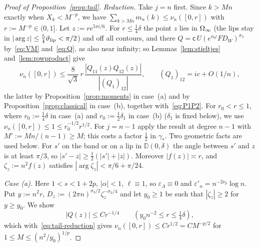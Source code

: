 \begin{proof}[Proof of Proposition~\ref{prop:tail}]
\emph{Reduction.} Take $j=n$ first. Since $k>Mn$ exactly when $X_k<M^{-p}$, we have
$\sum_{k>Mn}m_n(k)\le\nu_n([0,r])$ with $r:=M^{-p}\in(0,1]$. Let $z:=re^{5\pi i/6}$. For $r\le\frac14\delta$ the point
$z$ lies in $\Omega_{\infty}$ (the lips stay in $|\arg z|\le\frac54\vartheta_{\mathrm{lip}}<\pi/2$) and off all contours, and there
$Q=\mathsf c\,U(e^{n\varphi}FD_W)^{\sigma_3}$ by~\eqref{eq:VM} and~\eqref{eq:Q}, as also near infinity; so
Lemmas~\ref{lem:stieltjes} and~\ref{lem:rowproduct} give
\begin{equation}\label{eq:tail-reduction}
  \nu_n([0,r])\le\frac8{\sqrt3}\,r\,\frac{|Q_{11}(z)Q_{12}(z)|}{|(Q_1)_{12}|},\qquad (Q_1)_{12}=ic+O(1/n),
\end{equation}
the latter by Proposition~\ref{prop:moments} in case~(a) and by Proposition~\ref{prop:classical} in case~(b), together
with~\eqref{eq:P1P2}. For $r_0<r\le1$, where $r_0:=\frac14\delta$ in case~(a) and $r_0:=\frac12\delta_1$ in case~(b)
($\delta_1$ is fixed below), we use $\nu_n([0,r])\le1\le r_0^{-1/2}r^{1/2}$. For $j=n-1$ apply the
result at degree $n-1$ with $M':=Mn/(n-1)\ge M$; this costs a factor $\frac12$ in $\gamma_*$. Two geometric facts are
used below. For $s'$ on the band or on a lip in $\mathbb D(0,\delta)$ the angle between $s'$ and $z$ is at least $\pi/3$,
so $|s'-z|\ge\frac12(|s'|+|z|)$. Moreover $|f(z)|\asymp r$, and $\zeta_z:=n^2f(z)$ satisfies $|\arg\zeta_z|<\pi/6+\pi/24$.

\emph{Case (a).} Here $1<s<1+2p$, $|\alpha|<1$, $\ell\equiv1$, so $\varepsilon_\Lambda\equiv0$ and
$\varepsilon'_n=n^{-2\nu_p}\log n$. Put $y:=n^2r$, $D_z:=(2\pi n)^{\sigma_3/2}\zeta_z^{-\sigma_3/4}$ and let $y_0\ge1$ be such
that $|\zeta_z|\ge2$ for $y\ge y_0$. We show
\begin{equation}\label{eq:Q-ray}
  |Q(z)|\le Cr^{-1/4}\qquad(y_0n^{-2}\le r\le\tfrac14\delta),
\end{equation}
which with~\eqref{eq:tail-reduction} gives $\nu_n([0,r])\le Cr^{1/2}=CM^{-p/2}$ for $1\le M\le(n^2/y_0)^{1/p}$.


\end{proof}
